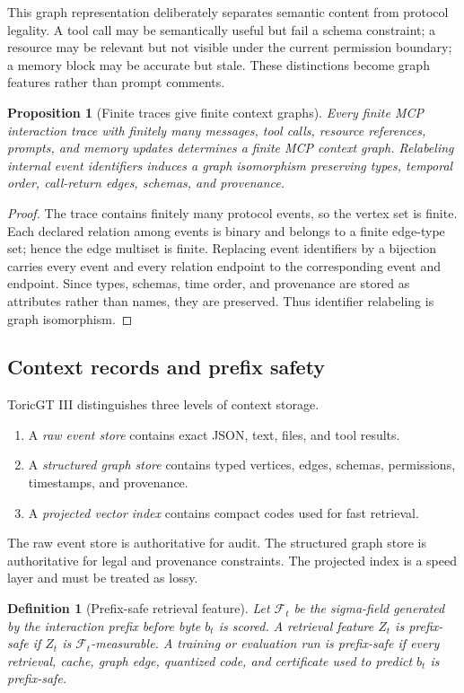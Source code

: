 \documentclass[11pt]{article}
\newtheorem{proposition}[theorem]{Proposition}
\newtheorem{definition}[theorem]{Definition}
\numberwithin{equation}{section}
\begin{document}
This graph representation deliberately separates semantic content from protocol legality. A tool call may be semantically useful but fail a schema constraint; a resource may be relevant but not visible under the current permission boundary; a memory block may be accurate but stale. These distinctions become graph features rather than prompt comments.

\begin{proposition}[Finite traces give finite context graphs]
Every finite MCP interaction trace with finitely many messages, tool calls, resource references, prompts, and memory updates determines a finite MCP context graph. Relabeling internal event identifiers induces a graph isomorphism preserving types, temporal order, call-return edges, schemas, and provenance.
\end{proposition}
\begin{proof}
The trace contains finitely many protocol events, so the vertex set is finite. Each declared relation among events is binary and belongs to a finite edge-type set; hence the edge multiset is finite. Replacing event identifiers by a bijection carries every event and every relation endpoint to the corresponding event and endpoint. Since types, schemas, time order, and provenance are stored as attributes rather than names, they are preserved. Thus identifier relabeling is graph isomorphism.
\end{proof}

\subsection{Context records and prefix safety}
ToricGT III distinguishes three levels of context storage.
\begin{enumerate}
\item A \emph{raw event store} contains exact JSON, text, files, and tool results.
\item A \emph{structured graph store} contains typed vertices, edges, schemas, permissions, timestamps, and provenance.
\item A \emph{projected vector index} contains compact codes used for fast retrieval.
\end{enumerate}
The raw event store is authoritative for audit. The structured graph store is authoritative for legal and provenance constraints. The projected index is a speed layer and must be treated as lossy.

\begin{definition}[Prefix-safe retrieval feature]
Let $\mathcal{F}_t$ be the sigma-field generated by the interaction prefix before byte $b_t$ is scored. A retrieval feature $Z_t$ is prefix-safe if $Z_t$ is $\mathcal{F}_t$-measurable. A training or evaluation run is prefix-safe if every retrieval, cache, graph edge, quantized code, and certificate used to predict $b_t$ is prefix-safe.
\end{definition}
\end{document}
